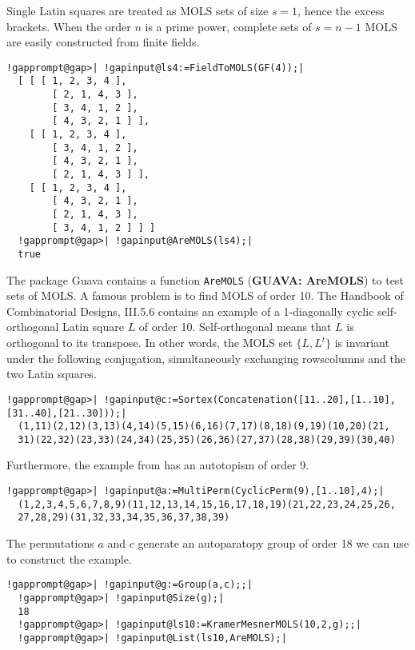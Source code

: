 \documentclass[a4paper,11pt]{report}
\begin{document}
{{ Single Latin squares are treated as MOLS sets of size $s=1$, hence the excess brackets. When the order $n$ is a prime power, complete sets of $s=n-1$ MOLS are easily constructed from finite fields. 
\begin{Verbatim}[commandchars=!@|,fontsize=\small,frame=single,label=Example]
  !gapprompt@gap>| !gapinput@ls4:=FieldToMOLS(GF(4));|
  [ [ [ 1, 2, 3, 4 ], 
        [ 2, 1, 4, 3 ], 
        [ 3, 4, 1, 2 ], 
        [ 4, 3, 2, 1 ] ], 
    [ [ 1, 2, 3, 4 ], 
        [ 3, 4, 1, 2 ], 
        [ 4, 3, 2, 1 ], 
        [ 2, 1, 4, 3 ] ], 
    [ [ 1, 2, 3, 4 ], 
        [ 4, 3, 2, 1 ], 
        [ 2, 1, 4, 3 ], 
        [ 3, 4, 1, 2 ] ] ]
  !gapprompt@gap>| !gapinput@AreMOLS(ls4);|
  true
\end{Verbatim}
 The package \textsf{Guava} contains a function \texttt{AreMOLS} (\textbf{GUAVA: AreMOLS}) to test sets of MOLS. A famous problem is to find MOLS of order 10. The
Handbook of Combinatorial Designs{\nobreakspace}\cite{CD07}, III.5.6 contains an example of a 1-diagonally cyclic self-orthogonal Latin
square $L$ of order 10. Self-orthogonal means that $L$ is orthogonal to its transpose. In other words, the MOLS set $\{L,L^t\}$ is invariant under the following conjugation, simultaneously exchanging
rows{\textendash}columns and the two Latin squares. 
\begin{Verbatim}[commandchars=!@|,fontsize=\small,frame=single,label=Example]
  !gapprompt@gap>| !gapinput@c:=Sortex(Concatenation([11..20],[1..10],[31..40],[21..30]));|
  (1,11)(2,12)(3,13)(4,14)(5,15)(6,16)(7,17)(8,18)(9,19)(10,20)(21,
  31)(22,32)(23,33)(24,34)(25,35)(26,36)(27,37)(28,38)(29,39)(30,40)
\end{Verbatim}
 Furthermore, the example from{\nobreakspace}\cite{CD07} has an autotopism of order 9. 
\begin{Verbatim}[commandchars=!@|,fontsize=\small,frame=single,label=Example]
  !gapprompt@gap>| !gapinput@a:=MultiPerm(CyclicPerm(9),[1..10],4);|
  (1,2,3,4,5,6,7,8,9)(11,12,13,14,15,16,17,18,19)(21,22,23,24,25,26,
  27,28,29)(31,32,33,34,35,36,37,38,39)
\end{Verbatim}
 The permutations $a$ and $c$ generate an autoparatopy group of order 18 we can use to construct the
example. 
\begin{Verbatim}[commandchars=!@|,fontsize=\small,frame=single,label=Example]
  !gapprompt@gap>| !gapinput@g:=Group(a,c);;|
  !gapprompt@gap>| !gapinput@Size(g);|
  18
  !gapprompt@gap>| !gapinput@ls10:=KramerMesnerMOLS(10,2,g);;|
  !gapprompt@gap>| !gapinput@List(ls10,AreMOLS);|

\end{Verbatim}}}
\end{document}

